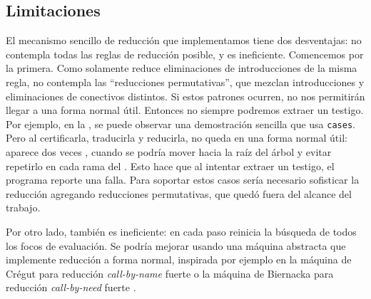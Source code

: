 \subsection{Limitaciones}
\label{fri:norm:sec:limitations}

El mecanismo sencillo de reducción que implementamos tiene dos desventajas: no contempla todas las reglas de reducción posible, y es ineficiente. Comencemos por la primera. Como solamente reduce eliminaciones de introducciones de la misma regla, no contempla las ``reducciones permutativas'', que mezclan introducciones y eliminaciones de conectivos distintos. Si estos patrones ocurren, no nos permitirán llegar a una forma normal útil. Entonces no siempre podremos extraer un testigo. Por ejemplo, en la , se puede observar una demostración sencilla que usa \lstinline{cases}. Pero al certificarla, traducirla y reducirla, no queda en una forma normal útil: aparece dos veces , cuando se podría mover hacia la raíz del árbol y evitar repetirlo en cada rama del . Esto hace que al intentar extraer un testigo, el programa reporte una falla. Para soportar estos casos sería necesario sofisticar la reducción agregando reducciones permutativas, que quedó fuera del alcance del trabajo.

Por otro lado, también es ineficiente: en cada paso reinicia la búsqueda de todos los focos de evaluación. Se podría mejorar usando una máquina abstracta que implemente reducción a forma normal, inspirada por ejemplo en la máquina de Crégut para reducción \textit{call-by-name} fuerte \cite{cregut-call-by-name} o la máquina de Biernacka para reducción \textit{call-by-need} fuerte \cite{biernacka-call-by-need}.

